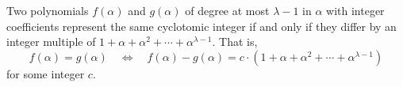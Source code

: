 Two polynomials $f(\alpha)$ and $g(\alpha)$ of degree at most $\lambda-1$ in $\alpha$ with integer coefficients represent the same cyclotomic integer if and only if they differ by an integer multiple of $1 + \alpha + \alpha^2 + \cdots + \alpha^{\lambda-1}$. That is,
$$f(\alpha) = g(\alpha) \quad \Longleftrightarrow \quad f(\alpha) - g(\alpha) = c \cdot (1 + \alpha + \alpha^2 + \cdots + \alpha^{\lambda-1})$$
for some integer $c$.
